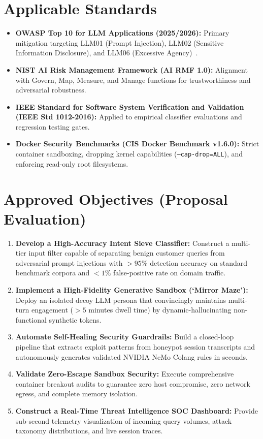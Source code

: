 \documentclass[12pt,a4paper,oneside]{report}
\begin{document}
\section{Applicable Standards}
\begin{itemize}
    \item \textbf{OWASP Top 10 for LLM Applications (2025/2026):} Primary mitigation targeting LLM01 (Prompt Injection), LLM02 (Sensitive Information Disclosure), and LLM06 (Excessive Agency)~\cite{owasp2023top10}.
    \item \textbf{NIST AI Risk Management Framework (AI RMF 1.0):} Alignment with Govern, Map, Measure, and Manage functions for trustworthiness and adversarial robustness.
    \item \textbf{IEEE Standard for Software System Verification and Validation (IEEE Std 1012-2016):} Applied to empirical classifier evaluations and regression testing gates.
    \item \textbf{Docker Security Benchmarks (CIS Docker Benchmark v1.6.0):} Strict container sandboxing, dropping kernel capabilities (\texttt{--cap-drop=ALL}), and enforcing read-only root filesystems.
\end{itemize}

\section{Approved Objectives (Proposal Evaluation)}
\begin{enumerate}
    \item \textbf{Develop a High-Accuracy Intent Sieve Classifier:} Construct a multi-tier input filter capable of separating benign customer queries from adversarial prompt injections with $>95\%$ detection accuracy on standard benchmark corpora and $<1\%$ false-positive rate on domain traffic.
    \item \textbf{Implement a High-Fidelity Generative Sandbox (`Mirror Maze'):} Deploy an isolated decoy LLM persona that convincingly maintains multi-turn engagement ($>5$ minutes dwell time) by dynamic-hallucinating non-functional synthetic tokens.
    \item \textbf{Automate Self-Healing Security Guardrails:} Build a closed-loop pipeline that extracts exploit patterns from honeypot session transcripts and autonomously generates validated NVIDIA NeMo Colang rules in seconds.
    \item \textbf{Validate Zero-Escape Sandbox Security:} Execute comprehensive container breakout audits to guarantee zero host compromise, zero network egress, and complete memory isolation.
    \item \textbf{Construct a Real-Time Threat Intelligence SOC Dashboard:} Provide sub-second telemetry visualization of incoming query volumes, attack taxonomy distributions, and live session traces.
\end{enumerate}
\end{document}
